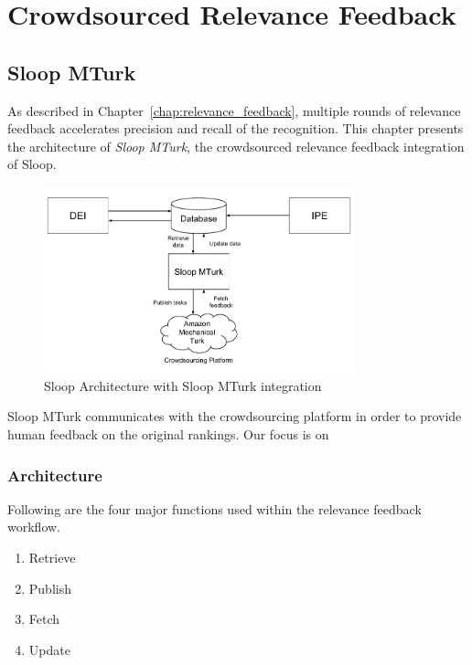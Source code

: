 \graphicspath{{./images/chap5/}}
\chapter{Crowdsourced Relevance Feedback}
\label{chap:sloop_mturk}
\section{Sloop MTurk}

As described in Chapter~\ref{chap:relevance_feedback}, multiple rounds of relevance
feedback accelerates precision and recall of the recognition. This chapter
presents the architecture of \emph{Sloop MTurk}, the crowdsourced relevance
feedback integration of Sloop.

\begin{figure}[ht]
  \centering
  \includegraphics[width=0.8\textwidth]{sloop/turk_system}
  \caption{Sloop Architecture with Sloop MTurk integration}
  \label{fig:turk_overview}
\end{figure}

Sloop MTurk communicates with the crowdsourcing platform in order to provide
human feedback on the original rankings. Our focus is on

\subsection{Architecture}

Following are the four major functions used within the relevance feedback
workflow.
\begin{enumerate}
	\item Retrieve
	\item Publish
	\item Fetch
	\item Update
\end{enumerate}

